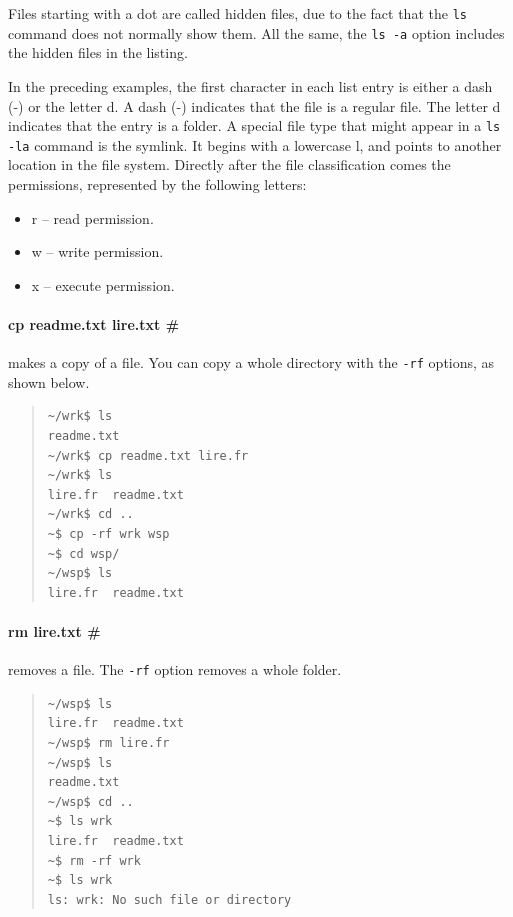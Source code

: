 \documentclass[a4paper,12pt,openany]{book}
\begin{document}
Files starting with a dot are called hidden files,
due to the fact that the \verb|ls| command does not
normally show them. All the same,
the \verb|ls -a| option includes the
hidden files in the listing.

In the preceding examples, the first character
in each list entry is either a dash (-) or the letter d.
A dash (-) indicates that the file is a regular file.
The letter d indicates that the entry is a folder.
A special file type that might appear in a
\verb|ls -la| command is the symlink. It begins
with a lowercase l, and points to another location
in the file system.
Directly after the file classification comes the permissions,
represented by the following letters:
\begin{itemize}
\item r -- read permission.
\item w -- write permission.
\item x -- execute permission.
\end{itemize}

\paragraph{cp readme.txt lire.txt \#} 
makes a copy
of a file. You can copy a whole directory
with the \verb|-rf| options, as shown below.
\begin{quote}
\begin{verbatim}
~/wrk$ ls
readme.txt
~/wrk$ cp readme.txt lire.fr
~/wrk$ ls
lire.fr  readme.txt
~/wrk$ cd ..
~$ cp -rf wrk wsp
~$ cd wsp/
~/wsp$ ls
lire.fr  readme.txt
\end{verbatim}
\end{quote}

\paragraph{rm lire.txt \#} 
removes a file.
The \verb|-rf| option 
removes a whole folder.
\begin{quote}
\begin{verbatim}
~/wsp$ ls
lire.fr  readme.txt
~/wsp$ rm lire.fr
~/wsp$ ls
readme.txt
~/wsp$ cd ..
~$ ls wrk
lire.fr  readme.txt
~$ rm -rf wrk
~$ ls wrk
ls: wrk: No such file or directory
\end{verbatim}
\end{quote}
\end{document}
